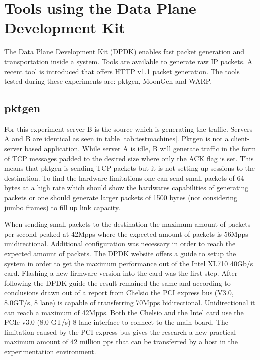 \section{Tools using the Data Plane Development Kit}
The Data Plane Development Kit (DPDK) enables fast packet generation and transportation inside a system. Tools are available to generate raw IP packets. A recent tool is introduced that offers HTTP v1.1 packet generation. The tools tested during these experiments are: pktgen, MoonGen and WARP. 

\subsection{pktgen}\label{sub:pktgen}
For this experiment server B is the source which is generating the traffic. 
Servers A and B are identical as seen in table \ref{tab:testmachines}. Pktgen is not a client-server based application.
While server A is idle, B will generate traffic in the form of TCP messages padded to the desired size where only the ACK flag is set. 
This means that pktgen is sending TCP packets but it is not setting up sessions to the destination.
To find the hardware limitations one can send small packets of 64 bytes at a high rate which should show the hardwares capabilities of generating packets or one should generate larger packets of 1500 bytes (not considering jumbo frames) to fill up link capacity.
 
When sending small packets to the destination the maximum amount of packets per second peaked at 42Mpps where the expected amount of packets is 56Mpps unidirectional. 
Additional configuration was necessary in order to reach the expected amount of packets.
The DPDK website offers a guide \cite{intelguidedpdk} to setup the system in order to get the maximum performance out of the Intel XL710 40Gb/s card. 
Flashing a new firmware version into the card was the first step. 
After following the DPDK guide the result remained the same and according to conclusions drawn out of a report from Chelsio \cite{chelsio} the PCI express bus (V3.0, 8.0GT/s, 8 lane) is capable of transferring 70Mpps bidirectional. 
Unidirectional it can reach a maximum of 42Mpps.
Both the Chelsio\cite{t580} and the Intel\cite{xl710} card use the PCIe v3.0 (8.0 GT/s) 8 lane interface to connect to the main board.
The limitation caused by the PCI express bus gives the research a new practical maximum amount of 42 million pps that can be transferred by a host in the experimentation environment.
   
